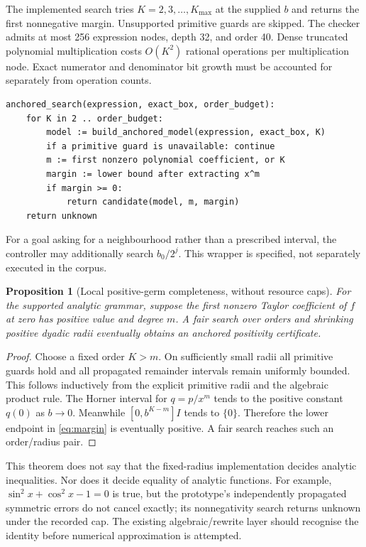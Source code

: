 \documentclass[11pt,a4paper]{article}
\newtheorem{proposition}[theorem]{Proposition}
\theoremstyle{definition}\newtheorem{definition}[theorem]{Definition}
\newcommand{\Unknown}{\textsf{unknown}}
\begin{document}
The implemented search tries $K=2,3,\ldots,K_{\max}$ at the supplied $b$ and
returns the first nonnegative margin. Unsupported primitive guards are skipped.
The checker admits at most 256 expression nodes, depth 32, and order 40. Dense
truncated polynomial multiplication costs $O(K^2)$ rational operations per
multiplication node. Exact numerator and denominator bit growth must be
accounted for separately from operation counts.

\begin{lstlisting}
anchored_search(expression, exact_box, order_budget):
    for K in 2 .. order_budget:
        model := build_anchored_model(expression, exact_box, K)
        if a primitive guard is unavailable: continue
        m := first nonzero polynomial coefficient, or K
        margin := lower bound after extracting x^m
        if margin >= 0:
            return candidate(model, m, margin)
    return unknown
\end{lstlisting}

For a goal asking for a neighbourhood rather than a prescribed interval, the
controller may additionally search $b_0/2^j$. This wrapper is specified, not
separately executed in the corpus.

\begin{proposition}[Local positive-germ completeness, without resource caps]
For the supported analytic grammar, suppose the first nonzero Taylor
coefficient of $f$ at zero has positive value and degree $m$. A fair search over
orders and shrinking positive dyadic radii eventually obtains an anchored
positivity certificate.
\end{proposition}
\begin{proof}
Choose a fixed order $K>m$. On sufficiently small radii all primitive guards
hold and all propagated remainder intervals remain uniformly bounded. This
follows inductively from the explicit primitive radii and the algebraic product
rule. The Horner interval for $q=p/x^m$ tends to the positive constant $q(0)$
as $b\to0$. Meanwhile $[0,b^{K-m}]I$ tends to $\{0\}$. Therefore the lower
endpoint in \eqref{eq:margin} is eventually positive. A fair search reaches such
an order/radius pair.
\end{proof}

This theorem does not say that the fixed-radius implementation decides analytic
inequalities. Nor does it decide equality of analytic functions. For example,
$\sin^2x+\cos^2x-1=0$ is true, but the prototype's independently propagated
symmetric errors do not cancel exactly; its nonnegativity search returns
\Unknown{} under the recorded cap. The existing algebraic/rewrite layer should
recognise the identity before numerical approximation is attempted.
\end{document}
